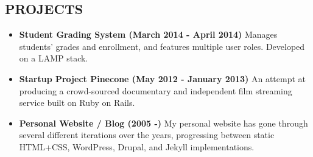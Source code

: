 \documentclass[line, overlapped]{res}
\begin{document}
\begin{resume}



    \section{PROJECTS}

    \begin{itemize}[leftmargin=10pt]
        \item \textbf{Student Grading System (March 2014 - April 2014)} Manages students' grades and enrollment, and features multiple user roles. Developed on a LAMP stack.
        \item \textbf{Startup Project Pinecone (May 2012 - January 2013)} An attempt at producing a crowd-sourced documentary and independent film streaming service built on Ruby on Rails.
        \item \textbf{Personal Website / Blog (2005 -)} My personal website has gone through several different iterations over the years, progressing between static HTML+CSS, WordPress, Drupal, and Jekyll implementations.
    \end{itemize}

\end{resume}
\end{document}
